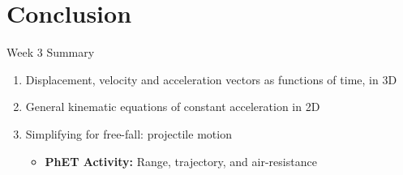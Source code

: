 \documentclass{beamer}
\begin{document}
\section{Conclusion}

\begin{frame}{Week 3 Summary}
\begin{enumerate}
\item Displacement, velocity and acceleration vectors \alert{as functions of time}, in 3D
\item General kinematic equations of constant acceleration in 2D
\item Simplifying for free-fall: \alert{projectile motion}
\begin{itemize}
\item \textbf{PhET Activity:} Range, trajectory, and air-resistance
\end{itemize}
\end{enumerate}
\end{frame}
\end{document}
